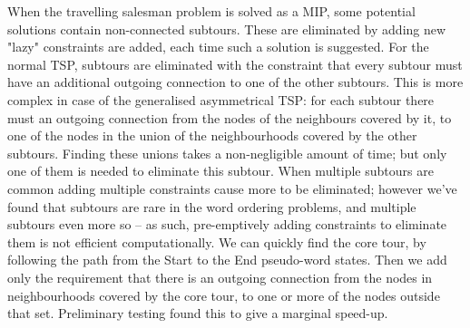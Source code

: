 \documentclass[11pt]{article}
\theoremstyle{plain}
\theoremstyle{definition}
\begin{document}
When the travelling salesman problem is solved as a MIP,  some potential solutions contain non-connected subtours. These are eliminated by adding new "lazy" constraints are added, each time such a solution is suggested. For the normal TSP, subtours are eliminated with the constraint that every subtour must have an additional outgoing connection to one of the other subtours. This is more complex in case of the generalised asymmetrical TSP: for each subtour there must an outgoing connection from the nodes of the neighbours covered by it, to one of the nodes in the union of the neighbourhoods covered by the other subtours. Finding these unions takes a non-negligible amount of time; but only one of them is needed to eliminate this subtour. When multiple subtours are common adding multiple constraints cause more to be eliminated; however we've found that subtours are rare in the word ordering problems, and multiple subtours even more so -- as such, pre-emptively adding constraints to eliminate them is not efficient computationally. We can quickly find the core tour, by following the path from the Start to the End pseudo-word states. Then we add only the requirement that there is an outgoing connection from the nodes in neighbourhoods covered by the core tour, to one or more of the nodes outside that set. Preliminary testing found this to give a marginal speed-up.
\end{document}
